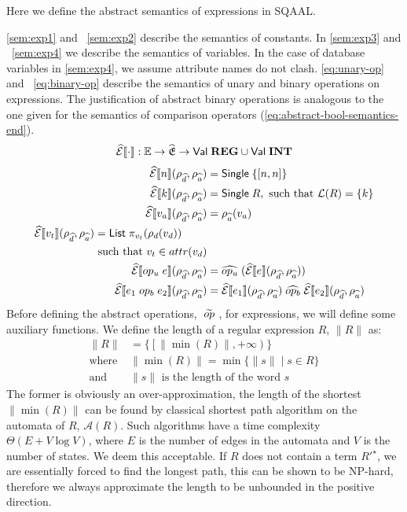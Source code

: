 Here we define the abstract semantics of expressions in SQAAL.

\autoref{sem:exp1} and ~\ref{sem:exp2} describe the semantics of constants.
In \autoref{sem:exp3} and ~\ref{sem:exp4} we describe the semantics of variables.
In the case of database variables in \autoref{sem:exp4}, we assume attribute names do not clash.
\autoref{eq:unary-op} and ~\ref{eq:binary-op} describe the semantics of unary and binary operations on expressions.
The justification of abstract binary operations is analogous to the one given for the semantics of comparison operators (\autoref{eq:abstract-bool-semantics-end}).
\begin{align}
    \widehat{\mathcal{E}}\llbracket \cdot \rrbracket : \mathbb{E} \rightarrow \widehat{\mathfrak{E}} \rightarrow \mathsf{Val} \; \mathbf{REG} \cup \mathsf{Val} \; \mathbf{INT}
\end{align}
\begin{align}
    \absexpsem{n}(\rho_{\ab{d}}, \rho_{\ab{a}}) &= \mathsf{Single} \; \{ [n, n] \} \label{sem:exp1} \\
    \absexpsem{k}(\rho_{\ab{d}}, \rho_{\ab{a}}) &= \mathsf{Single} \; R,  \text{ such that }\mathcal{L}(R) = \{ k \} \label{sem:exp2} \\
    \absexpsem{v_a}(\rho_{\ab{d}}, \rho_{\ab{a}}) &=  \rho_{\ab{a}}(v_a) \label{sem:exp3} \\
    \begin{split}
        \absexpsem{v_t}(\rho_{\ab{d}}, \rho_{\ab{a}}) &=  \mathsf{List} \; \pi_{v_t}(\rho_d(v_d)) \\
        &\text{ such that } v_t \in attr(v_d) \label{sem:exp4}
    \end{split} \\
    \absexpsem{op_u \; e}(\rho_{\ab{d}}, \rho_{\ab{a}}) &= \ab{op_u} \; (\absexpsem{e}(\rho_{\ab{d}}, \rho_{\ab{a}})) \label{eq:unary-op} \\
    \absexpsem{e_1 \;op_b\; e_2}(\rho_{\ab{d}}, \rho_{\ab{a}}) &= \absexpsem{e_1}(\rho_{\ab{d}}, \rho_{\ab{a}}) \;\ab{op_b}\; \absexpsem{e_2}(\rho_{\ab{d}}, \rho_{\ab{a}}) \label{eq:binary-op}
\end{align}
Before defining the abstract operations, $\;\widetilde{op}\;$, for expressions, we will define some auxiliary functions.
We define the length of a regular expression $R$, $\|R\|$ as:
\begin{align}\label{eq:r1}
    \|R\| & = \{ \left[ \|\min(R)\|, +\infty \right) \} \\
    \text{where } & \|\min(R)\| = \min\{ \|s\| \mid s \in R \} \\ \label{eq:r2}
    \text{and } & \|s\| \text{ is the length of the word $s$}
\end{align}
The former is obviously an over-approximation, the length of the shortest $\|\min(R)\|$ can be found by classical shortest path algorithm on the automata of $R$, $\mathcal{A}(R)$.
Such algorithms have a time complexity $\Theta(E + V \log V)$, where $E$ is the number of edges in the automata and $V$ is the number of states.
We deem this acceptable.
If $R$ does not contain a term $R'^\star$, we are essentially forced to find the longest path, this can be shown to be NP-hard, therefore we always approximate the length to be unbounded in the positive direction.

